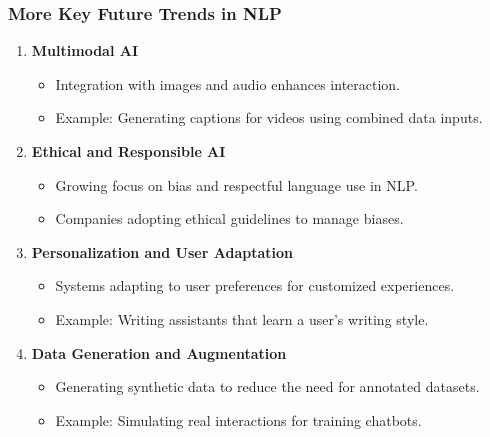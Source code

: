 \documentclass[aspectratio=169]{beamer}
\begin{document}
\begin{frame}[fragile]
    \frametitle{More Key Future Trends in NLP}
    \begin{enumerate}[resume]
        \item \textbf{Multimodal AI}
            \begin{itemize}
                \item Integration with images and audio enhances interaction.
                \item Example: Generating captions for videos using combined data inputs.
            \end{itemize}

        \item \textbf{Ethical and Responsible AI}
            \begin{itemize}
                \item Growing focus on bias and respectful language use in NLP.
                \item Companies adopting ethical guidelines to manage biases.
            \end{itemize}

        \item \textbf{Personalization and User Adaptation}
            \begin{itemize}
                \item Systems adapting to user preferences for customized experiences.
                \item Example: Writing assistants that learn a user’s writing style.
            \end{itemize}

        \item \textbf{Data Generation and Augmentation}
            \begin{itemize}
                \item Generating synthetic data to reduce the need for annotated datasets.
                \item Example: Simulating real interactions for training chatbots.
            \end{itemize}
    \end{enumerate}
\end{frame}
\end{document}
